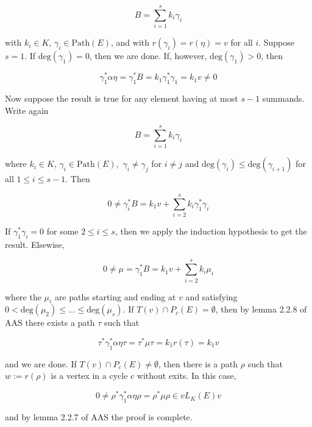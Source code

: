 \begin{solution}
    $$B=\sum_{i=1}^sk_i\gamma_i$$

    with $k_i\in K$, $\gamma_i\in\text{Path}(E)$, and with $r(\gamma_i)=r(\eta)=v$ for all $i$. Suppose
    $s=1$. If $\text{deg}(\gamma_1)=0$, then we are done. If, however, $\text{deg}(\gamma_1)>0$, then
    
    $$\gamma_1^*\alpha\eta=\gamma_1^*B=k_1\gamma_1^*\gamma_1=k_1v\neq0$$

    Now suppose the result is true for any element having at most $s-1$ summands. Write again
    
    $$B=\sum_{i=1}^sk_i\gamma_i$$
    
    where $k_i\in K$, $\gamma_i\in\text{Path}(E),$ $\gamma_i\neq\gamma_j$ for $i\neq j$ and 
    $\text{deg}(\gamma_i)\leq\text{deg}(\gamma_{i+1})$ for all $1\leq i\leq s-1$. Then

    $$0\neq\gamma_i^*B=k_1v+\sum_{i=2}^sk_i\gamma_1^*\gamma_i$$
    
    If $\gamma_1^*\gamma_i=0$ for some $2\leq i\leq s$, then we apply the induction hypothesis to get
    the result. Elsewise,
    
    $$0\neq\mu=\gamma_1^*B=k_1v+\sum_{i=2}^sk_i\mu_i$$
    
    where the $\mu_i$ are paths starting and ending at $v$ and satisfying
    $0<\text{deg}(\mu_2)\leq\ldots\leq\text{deg}(\mu_s)$. If $T(v)\cap P_c(E)=\emptyset$, then by lemma
    2.2.8 of AAS there exists a path $\tau$ such that
    
    $$\tau^*\gamma_1^*\alpha\eta\tau=\tau^*\mu\tau=k_1r(\tau)=k_1v$$
    
    and we are done. If $T(v)\cap P_c(E)\neq\emptyset$, then there is a path $\rho$ such that
    $w:=r(\rho)$ is a vertex in a cycle $c$ without exits. In this case,
    
    $$0\neq\rho^*\gamma_1^*\alpha\eta\rho=\rho^*\mu\rho\in vL_K(E)v$$

    and by lemma 2.2.7 of AAS the proof is complete.

\end{solution}